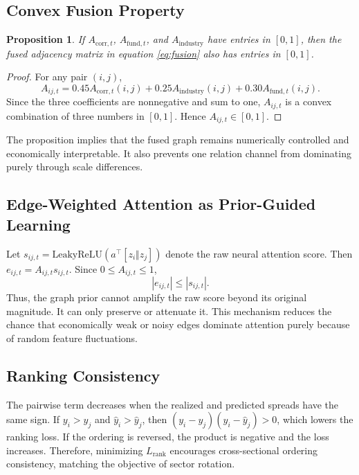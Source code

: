 \documentclass[12pt]{article}
\newtheorem{proposition}{Proposition}
\begin{document}
\subsection{Convex Fusion Property}

\begin{proposition}
If $A_{\mathrm{corr},t}$, $A_{\mathrm{fund},t}$, and $A_{\mathrm{industry}}$ have entries in $[0,1]$, then the fused adjacency matrix in equation \eqref{eq:fusion} also has entries in $[0,1]$.
\end{proposition}

\begin{proof}
For any pair $(i,j)$,
\[
A_{ij,t}=0.45A_{\mathrm{corr},t}(i,j)+0.25A_{\mathrm{industry}}(i,j)+0.30A_{\mathrm{fund},t}(i,j).
\]
Since the three coefficients are nonnegative and sum to one, $A_{ij,t}$ is a convex combination of three numbers in $[0,1]$. Hence $A_{ij,t}\in[0,1]$.
\end{proof}

The proposition implies that the fused graph remains numerically controlled and economically interpretable. It also prevents one relation channel from dominating purely through scale differences.

\subsection{Edge-Weighted Attention as Prior-Guided Learning}

Let $s_{ij,t}=\mathrm{LeakyReLU}(a^\top[z_i\Vert z_j])$ denote the raw neural attention score. Then $e_{ij,t}=A_{ij,t}s_{ij,t}$. Since $0\leq A_{ij,t}\leq 1$,
\begin{equation}
|e_{ij,t}|\leq |s_{ij,t}|.
\end{equation}
Thus, the graph prior cannot amplify the raw score beyond its original magnitude. It can only preserve or attenuate it. This mechanism reduces the chance that economically weak or noisy edges dominate attention purely because of random feature fluctuations.

\subsection{Ranking Consistency}

The pairwise term decreases when the realized and predicted spreads have the same sign. If $y_i>y_j$ and $\widehat{y}_i>\widehat{y}_j$, then $(y_i-y_j)(\widehat{y}_i-\widehat{y}_j)>0$, which lowers the ranking loss. If the ordering is reversed, the product is negative and the loss increases. Therefore, minimizing $L_{\mathrm{rank}}$ encourages cross-sectional ordering consistency, matching the objective of sector rotation.
\end{document}
